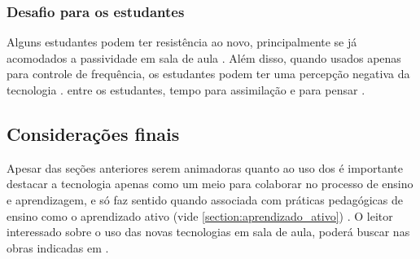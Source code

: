 \subsubsection{Desafio para os estudantes}
Alguns estudantes podem ter resistência ao novo, principalmente se já acomodados
a passividade em sala de aula \cite{Terrion2012, Kay2009}. Além disso, quando
usados apenas para controle de frequência, os estudantes podem ter uma percepção
negativa da tecnologia \cite{Terrion2012, Caldwell2007}. entre os estudantes, tempo para assimilação e para pensar \cite{Mazur2009, Crouch2001}.

\subsection{Considerações finais}
Apesar das seções anteriores serem animadoras quanto ao uso dos
{\clickers} é importante destacar a tecnologia apenas como um meio para
colaborar no processo de ensino e aprendizagem, e só faz sentido quando associada
com práticas pedagógicas de ensino como o aprendizado ativo
(vide \autoref{section:aprendizado_ativo}) \cite{Terrion2012, Moran2006}. O leitor interessado
sobre o uso das novas tecnologias em sala de aula, poderá buscar nas obras
indicadas em \cite{portalBrasil2014}.
